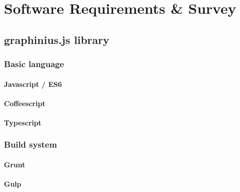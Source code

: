 \chapter{Software Requirements \& Survey}
\label{ch:software_requirements}


\section{graphinius.js library}
\label{library}

	\subsection{Basic language}
	\label{ssect:language}
	
		\subsubsection{Javascript / ES6}
		\label{sssect:js_es6}
		
		\subsubsection{Coffeescript}
		\label{sssect:coffeescript}
		
		\subsubsection{Typescript}
		\label{sssect:typescript}
	
	\subsection{Build system}
	\label{ssect:build_system}
	
		\subsubsection{Grunt}
		\label{sssect:grunt}
		
		\subsubsection{Gulp}
		\label{sssect:gulp}
		
